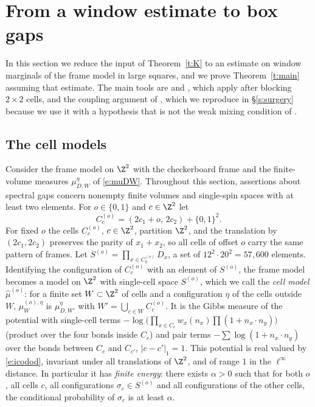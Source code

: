\section{From a window estimate to box gaps}\label{s:mixing}

In this section we reduce the input of Theorem~\ref{t:K} to an estimate on window marginals of the frame model in large squares, and we prove Theorem~\ref{t:main} assuming that estimate. The main tools are \cite[Theorem~2.1]{MOS94} and \cite[Theorem~4.1]{MO94}, which apply after blocking $2 \times 2$ cells, and the coupling argument of \cite[Proposition~2.1]{MOS94}, which we reproduce in \S\ref{s:surgery} because we use it with a hypothesis that is not the weak mixing condition of \cite{MOS94}.

\subsection{The cell models}\label{s:cells}

Consider the frame model on $\Z^2$ with the checkerboard frame and the finite-volume measures $\mu^\eta_{D, W}$ of \eqref{e:muDW}. Throughout this section, assertions about spectral gaps concern nonempty finite volumes and single-spin spaces with at least two elements. For $o \in \{0, 1\}$ and $c \in \Z^2$ let
\begin{equation*}
C^{(o)}_c = (2 c_1 + o, \, 2 c_2) + \{0, 1\}^2 .
\end{equation*}
For fixed $o$ the cells $C^{(o)}_c$, $c \in \Z^2$, partition $\Z^2$, and the translation by $(2c_1, 2c_2)$ preserves the parity of $x_1 + x_2$, so all cells of offset $o$ carry the same pattern of frames. Let $S^{(o)} = \prod_{x \in C^{(o)}_0} D_x$, a set of $12^2 \cdot 20^2 = 57{, }600$ elements. Identifying the configuration of $C^{(o)}_c$ with an element of $S^{(o)}$, the frame model becomes a model on $\Z^2$ with single-cell space $S^{(o)}$, which we call the \emph{cell model} $\hat\mu^{(o)}$: for a finite set $W \subset \Z^2$ of cells and a configuration $\eta$ of the cells outside $W$, $\hat\mu^{(o), \eta}_W$ is $\mu^\eta_{D, W'}$ with $W' = \bigcup_{c \in W} C^{(o)}_c$. It is the Gibbs measure of the potential with single-cell terms $-\log \bigl( \prod_{x \in C_c} w_x(n_x) \prod (1 + n_x \cdot n_y) \bigr)$ (product over the four bonds inside $C_c$) and pair terms $-\sum \log (1 + n_x \cdot n_y)$ over the bonds between $C_c$ and $C_{c'}$, $|c - c'|_1 = 1$. This potential is real valued by \eqref{e:icodod}, invariant under all translations of $\Z^2$, and of range $1$ in the $\ell^\infty$ distance. In particular it has \emph{finite energy}: there exists $\alpha > 0$ such that for both $o$, all cells $c$, all configurations $\sigma_c \in S^{(o)}$ and all configurations of the other cells, the conditional probability of $\sigma_c$ is at least $\alpha$.

